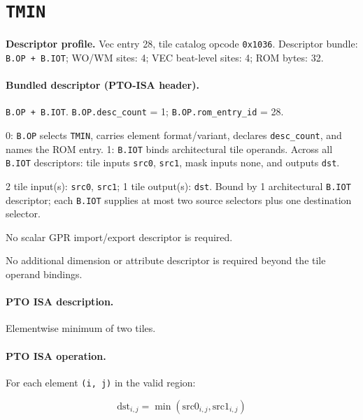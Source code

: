 \section{\texttt{TMIN}}
\noindent\textbf{Descriptor profile.} Vec entry 28, tile catalog opcode \texttt{0x1036}. Descriptor bundle: \texttt{B.OP + B.IOT}; WO/WM sites: 4; VEC beat-level sites: 4; ROM bytes: 32.\par\smallskip
{}
\paragraph{Bundled descriptor (PTO-ISA header).}
\begin{description}[leftmargin=0.18\linewidth,style=nextline]
\item[Bundle] \texttt{B.OP + B.IOT}. \texttt{B.OP.desc\_count} = 1; \texttt{B.OP.rom\_entry\_id} = 28.
\item[Assembly] 0: \texttt{B.OP} selects \texttt{TMIN}, carries element format/variant, declares \texttt{desc\_count}, and names the ROM entry. 1: \texttt{B.IOT} binds architectural tile operands. Across all \texttt{B.IOT} descriptors: tile inputs \texttt{src0}, \texttt{src1}, mask inputs none, and outputs \texttt{dst}.
\item[Tile operands] 2 tile input(s): \texttt{src0}, \texttt{src1}; 1 tile output(s): \texttt{dst}. Bound by 1 architectural \texttt{B.IOT} descriptor; each \texttt{B.IOT} supplies at most two source selectors plus one destination selector.
\item[Scalar GPR operands] No scalar GPR import/export descriptor is required.
\item[Metadata operands] No additional dimension or attribute descriptor is required beyond the tile operand bindings.
\end{description}
\par\smallskip
{\small
\paragraph{PTO ISA description.}
Elementwise minimum of two tiles.
\paragraph{PTO ISA operation.}
For each element \texttt{(i, j)} in the valid region:

\[
\mathrm{dst}_{i,j} = \min(\mathrm{src0}_{i,j}, \mathrm{src1}_{i,j})
\]
}\par\smallskip
